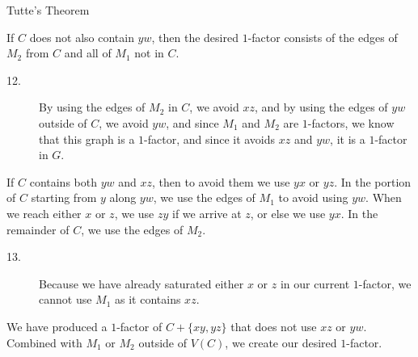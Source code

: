 \documentclass[10pt]{extarticle}
\begin{document}
{\begin{problem}{Tutte's Theorem}
\begin{description}[font=\scshape]
        If $C$ does not also contain $yw$, then the desired $1$-factor consists of the edges of $M_2$ from $C$ and all of $M_1$ not in $C$.
        \begin{description}
          \item[12.] By using the edges of $M_2$ in $C$, we avoid $xz$, and by using the edges of $yw$ outside of $C$, we avoid $yw$, and since $M_1$ and $M_2$ are $1$-factors, we know that this graph is a $1$-factor, and since it avoids $xz$ and $yw$, it is a $1$-factor in $G$.
        \end{description}
        If $C$ contains both $yw$ and $xz$, then to avoid them we use $yx$ or $yz$. In the portion of $C$ starting from $y$ along $yw$, we use the edges of $M_1$ to avoid using $yw$. When we reach either $x$ or $z$, we use $zy$ if we arrive at $z$, or else we use $yx$. In the remainder of $C$, we use the edges of $M_2$.
        \begin{description}
          \item[13.] Because we have already saturated either $x$ or $z$ in our current $1$-factor, we cannot use $M_1$ as it contains $xz$.
        \end{description}
        We have produced a $1$-factor of $C + \{xy,yz\}$ that does not use $xz$ or $yw$. Combined with $M_1$ or $M_2$ outside of $V(C)$, we create our desired $1$-factor.
    \end{description}
  \end{problem}
}
\end{document}
